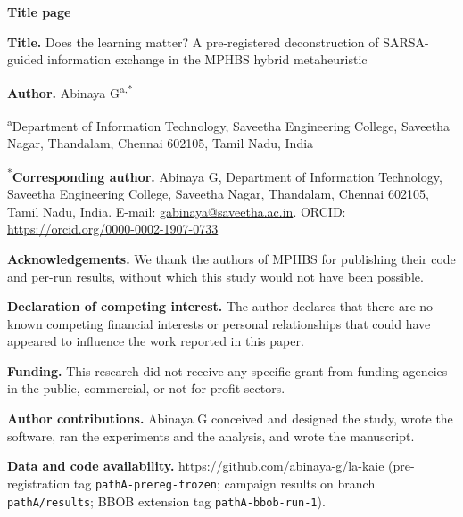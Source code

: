 \documentclass[11pt]{article}
\begin{document}
{\large\bfseries Title page}

\textbf{Title.} Does the learning matter? A pre-registered deconstruction of SARSA-guided information exchange in the
MPHBS hybrid metaheuristic

\textbf{Author.} Abinaya G\textsuperscript{a,*}

\textsuperscript{a}Department of Information Technology, Saveetha Engineering College, Saveetha Nagar, Thandalam,
Chennai 602105, Tamil Nadu, India

\textsuperscript{*}\textbf{Corresponding author.} Abinaya G, Department of Information Technology, Saveetha
Engineering College, Saveetha Nagar, Thandalam, Chennai 602105, Tamil Nadu, India.
E-mail: \url{gabinaya@saveetha.ac.in}.
ORCID: \href{https://orcid.org/0000-0002-1907-0733}{https://orcid.org/0000-0002-1907-0733}

\textbf{Acknowledgements.} We thank the authors of MPHBS for publishing their code and per-run results, without which
this study would not have been possible.

\textbf{Declaration of competing interest.} The author declares that there are no known competing financial interests
or personal relationships that could have appeared to influence the work reported in this paper.

\textbf{Funding.} This research did not receive any specific grant from funding agencies in the public, commercial, or
not-for-profit sectors.

\textbf{Author contributions.} Abinaya G conceived and designed the study, wrote the software, ran the experiments and
the analysis, and wrote the manuscript.

\textbf{Data and code availability.} \url{https://github.com/abinaya-g/la-kaie} (pre-registration tag
\texttt{pathA-prereg-frozen}; campaign results on branch \texttt{pathA/results}; BBOB extension tag
\texttt{pathA-bbob-run-1}).
\end{document}

